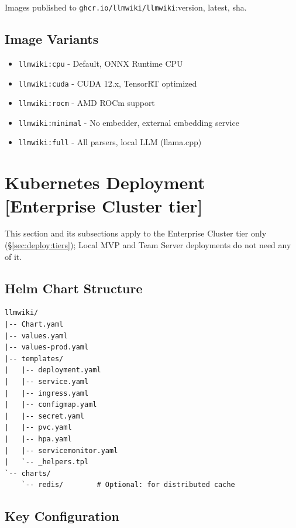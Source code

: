 Images published to \texttt{ghcr.io/llmwiki/llmwiki}:{version, latest, sha}.

\subsection{Image Variants}
\label{sec:deploy:variants}

\begin{itemize}
  \item \texttt{llmwiki:cpu} - Default, ONNX Runtime CPU
  \item \texttt{llmwiki:cuda} - CUDA 12.x, TensorRT optimized
  \item \texttt{llmwiki:rocm} - AMD ROCm support
  \item \texttt{llmwiki:minimal} - No embedder, external embedding service
  \item \texttt{llmwiki:full} - All parsers, local LLM (llama.cpp)
\end{itemize}

\section{Kubernetes Deployment [Enterprise Cluster tier]}
\label{sec:deploy:k8s}

This section and its subsections apply to the Enterprise Cluster tier only (\S\ref{sec:deploy:tiers}); Local MVP and Team Server deployments do not need any of it.

\subsection{Helm Chart Structure}
\label{sec:deploy:helm}

\begin{verbatim}
llmwiki/
|-- Chart.yaml
|-- values.yaml
|-- values-prod.yaml
|-- templates/
|   |-- deployment.yaml
|   |-- service.yaml
|   |-- ingress.yaml
|   |-- configmap.yaml
|   |-- secret.yaml
|   |-- pvc.yaml
|   |-- hpa.yaml
|   |-- servicemonitor.yaml
|   `-- _helpers.tpl
`-- charts/
    `-- redis/        # Optional: for distributed cache
\end{verbatim}

\subsection{Key Configuration}
\label{sec:deploy:k8s-config}

